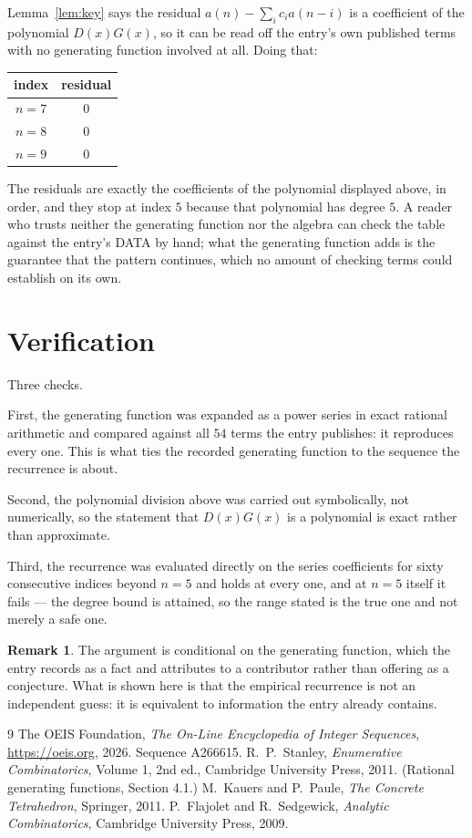 \documentclass[11pt,a4paper]{article}
\theoremstyle{plain}
\theoremstyle{definition}
\newtheorem{remark}[theorem]{Remark}
\begin{document}
Lemma~\ref{lem:key} says the residual $a(n)-\sum_ic_ia(n-i)$ is a coefficient of the
polynomial $D(x)G(x)$, so it can be read off the entry's own published terms with no
generating function involved at all. Doing that:
\begin{center}
\begin{tabular}{cc}
index & residual \\ \hline
$n=7$ & $0$ \\
$n=8$ & $0$ \\
$n=9$ & $0$
\end{tabular}
\end{center}
The residuals are exactly the coefficients of the polynomial displayed above, in order, and
they stop at index $5$ because that polynomial has degree $5$. A reader who trusts
neither the generating function nor the algebra can check the table against the entry's DATA
by hand; what the generating function adds is the guarantee that the pattern continues, which
no amount of checking terms could establish on its own.

\section{Verification}

Three checks.

First, the generating function was expanded as a power series in exact rational arithmetic and
compared against all $54$ terms the entry publishes: it reproduces every one. This is
what ties the recorded generating function to the sequence the recurrence is about.

Second, the polynomial division above was carried out symbolically, not numerically, so the
statement that $D(x)G(x)$ is a polynomial is exact rather than approximate.

Third, the recurrence was evaluated directly on the series coefficients for sixty consecutive
indices beyond $n=5$ and holds at every one, and at $n=5$ itself it fails --- the
degree bound is attained, so the range stated is the true one and not merely a safe one.

\begin{remark}
The argument is conditional on the generating function, which the entry records as a fact and
attributes to a contributor rather than offering as a conjecture. What is shown here is that
the empirical recurrence is not an independent guess: it is equivalent to information the
entry already contains.
\end{remark}

\begin{thebibliography}{9}
 The OEIS Foundation, \emph{The On-Line Encyclopedia of Integer
Sequences}, \url{https://oeis.org}, 2026. Sequence A266615.
 R.~P.~Stanley, \emph{Enumerative Combinatorics}, Volume 1, 2nd ed.,
Cambridge University Press, 2011. (Rational generating functions, Section 4.1.)
 M.~Kauers and P.~Paule, \emph{The Concrete Tetrahedron}, Springer, 2011.
 P.~Flajolet and R.~Sedgewick, \emph{Analytic Combinatorics}, Cambridge
University Press, 2009.
\end{thebibliography}
\end{document}
